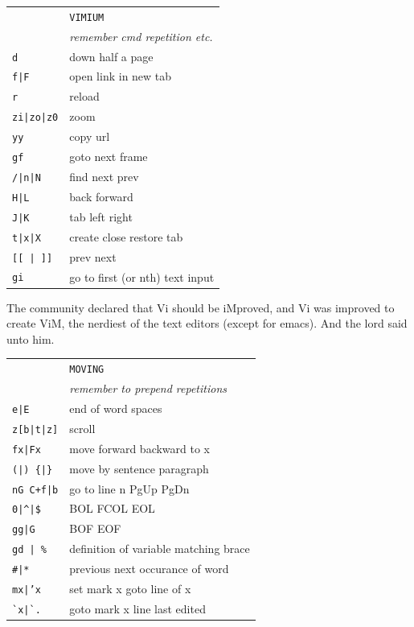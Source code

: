 \documentclass[a4paper,12pt]{article}
\begin{document}
\begin{multicols}{2}
\begin{tabular}{ll}
&\texttt{VIMIUM}\\
&\emph{remember cmd repetition etc.}\\
\texttt{d}&down half a page\\
\texttt{f|F}&open link \textbar{} in new tab\\
\texttt{r}&reload\\
\texttt{zi|zo|z0}&zoom\\
\texttt{yy}&copy url\\
\texttt{gf}&goto next frame\\
\texttt{/|n|N}&find \textbar{} next \textbar{} prev\\
\texttt{H|L}&back \textbar{} forward\\
\texttt{J|K}&tab left \textbar{} right\\
\texttt{t|x|X}&create \textbar{} close \textbar{} restore tab\\
\texttt{[[ | ]]}&prev \textbar{} next\\
\texttt{gi}&go to first (or nth) text input\\
\end{tabular}
\vfill
\columnbreak
The community declared that Vi should be iMproved, and Vi was improved to
create ViM, the nerdiest of the text editors (except for emacs). And the lord
said unto him.
\vfill
\begin{tabular}{ll}
&\texttt{MOVING}\\
&\emph{remember to prepend repetitions}\\
\texttt{e|E}& end of word \textbar{} spaces\\
\texttt{z[b|t|z]}& scroll\\
\texttt{fx|Fx}& move forward \textbar{} backward to x\\
\texttt{(|) \{|\}}& move by sentence \textbar{} paragraph\\
\texttt{nG C+f|b}& go to line n PgUp \textbar{} PgDn\\
\texttt{0|\^{}|\$}& BOL \textbar{} FCOL \textbar{}EOL\\
\texttt{gg|G}&BOF \textbar{} EOF\\
\texttt{gd | \%}& definition of variable \textbar{} matching brace\\
\texttt{\#|*}& previous \textbar{} next occurance of word\\
\texttt{mx|'x}&set mark x \textbar{} goto line of x\\
\texttt{\`{}x|\`{}.}&goto mark x \textbar{} line last edited\\
\end{tabular}


\end{multicols}
\end{document}
